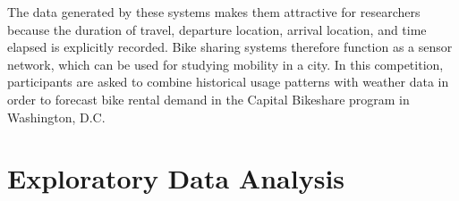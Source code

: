 The data generated by these systems makes them attractive for researchers
because the duration of travel, departure location, arrival location, 
and time elapsed is explicitly recorded. 
Bike sharing systems therefore function as a sensor network, 
which can be used for studying mobility in a city. 
In this competition, 
participants are asked to combine historical usage patterns with weather data in order to forecast bike rental demand in the Capital Bikeshare program in Washington, 
D.C.
















\section{Exploratory Data Analysis} \label{sec-preliminaries}


